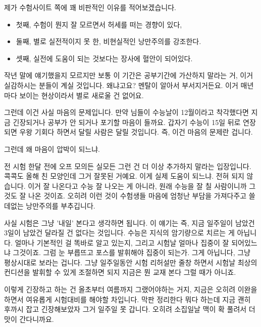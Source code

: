\vspace{5mm}

제가 수험사이트 쪽에 꽤 비판적인 이유를 적어보겠습니다.
\vspace{5mm}
\begin{itemize}
    \item 첫째, 수험이 뭔지 잘 모르면서 허세를 떠는 경향이 있다,
    \item 둘째, 별로 실전적이지 못 한, 비현실적인 낭만주의를 강조한다.
    \item 셋째, 실전에 도움이 되는 것보다는 장사에 혈안이 되어있다.
\end{itemize}
\vspace{5mm}

작년 말에 얘기했을지 모르지만 보통 이 기간은 공부기간에 가산하지 말라는 거, 이거 실감하시는 분들이 계실 것입니다.
왜냐고요? 멘탈이 알아서 부서지거든요.
이거 매년마다 보이는 현상이라서 별로 새로울 건 없어요.
\vspace{5mm}

그런데 이건 사실 마음의 문제입니다. 만약 님들이 수능날이 12월이라고 착각했다면 지금 긴장되거나 공부가 안 되거나 포기할 마음이 들까요.
갑자기 수능이 15일 뒤로 연장되면 우왕 기회다 하면서 달릴 사람은 달릴 것입니다.
즉, 이건 마음의 문제란 겁니다.
\vspace{5mm}

그런데 왜 마음이 압박이 되느냐.
\vspace{5mm}

전 시험 한달 전에 오프 모의든 실모든 그런 건 더 이상 추가하지 말라는 입장입니다. 콕콕도 올해 친 모양인데 그거 잘못된 거예요.
이게 실제 도움이 되느냐. 전혀 되지 않습니다. 이거 잘 나온다고 수능 잘 나오는 게 아니라, 원래 수능을 잘 칠 사람이니까 그것도 잘 나온 것이죠.
오히려 이런 것이 수험생들 마음에 엄청난 부담을 가져다주고 쓸데없는 낭만주의를 부추깁니다.
\vspace{5mm}

사실 시험은 그냥 '내일' 본다고 생각하면 됩니다. 이 얘기는 즉, 지금 일주일이 남았건 3일이 남았건 달라질 건 없다는 것입니다.
수능은 지식의 암기량으로 치르는 게 아닙니다. 얼마나 기본적인 걸 똑바로 알고 있는지, 그리고 시험날 얼마나 집중이 잘 되어있느냐 그것이죠.
그럼 눈 부릅뜨고 포스를 발휘해야 집중이 되는가. 그게 아닙니다, 그냥 평상시대로 보라는 겁니다.
그냥 일주일동안 시험 리허설만 줄창 하면서 시험날 최상의 컨디션을 발휘할 수 있게 조절하면 되지 지금은 뭔 교재 본다 그럴 때가 아니죠.
\vspace{5mm}

이렇게 긴장하고 하는 건 올초부터 여름까지 그랬어야하는 거지, 지금은 오히려 이완을 하면서 여유롭게 시험대비를 해야할 차입니다.
막판 정리한다 뭐다 하는데 지금 괜히 후까시 잡고 긴장해보았자 그거 일주일 못 갑니다. 오히려 소집일날 맥이 확 풀려서 더 맛이 간다니까요.
\vspace{5mm}

